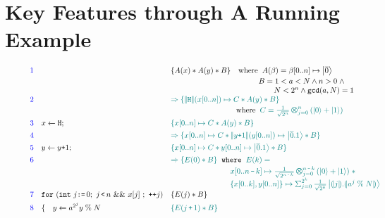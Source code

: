 \section{Key Features through A Running Example}
\label{sec:shors}

\begin{figure}[t]
{\small
\[\hspace*{-1em}
\begin{array}{r l  l}
\textcolor{blue}{1}
&&
\{A(x) * A(y) * B \}
\quad\text{where}\;\;
A(\beta) = \beta[0..n] \mapsto \ket{\overline{0}} 
\\[0.2em]
&&
\qquad\qquad\qquad
\qquad\qquad\quad
\begin{array}{l}
B = 1 < a < N \wedge n > 0 \;\wedge
\\\qquad N < 2^n \wedge \texttt{gcd}(a,N)=1
\end{array}
\\[0.5em]
\textcolor{blue}{2}
&
&
\textcolor{teal}{
\Rightarrow
\{\dabs{\ihadh}(x[0..n]) \mapsto C * A(y) * B \}
}
\\[0.2em]
&&
\qquad\qquad\qquad
\qquad\;\;
\text{where}
\;\;
\textcolor{teal}{
C = \shad{2^n}{n}{}
}
\\[0.5em]
\textcolor{blue}{3}
& \ssassign{x}{}{\ihadh};
&
\textcolor{teal}{
\{x[0..n] \mapsto C * A(y) * B \}
}
\\[0.4em]
\textcolor{blue}{4}
&
&
\textcolor{teal}{
\Rightarrow
\{x[0..n] \mapsto C * \dabs{y\splus 1}(y[0..n]) \mapsto \ket{\overline{0}.1} * B \}
}
\\[0.4em]
\textcolor{blue}{5}
& \ssassign{y}{}{y\splus 1};
&
\textcolor{teal}{
\{x[0..n] \mapsto C * y[0..n] \mapsto \ket{\overline{0}.1} * B \}
}
\\[0.4em]
\textcolor{blue}{6}
& 
&
\textcolor{teal}{
\Rightarrow
\{ E(0) * B \}
}
\;\;
\texttt{where}\;\;
\textcolor{teal}{E(k) =}
\\[0.2em]
&&
\qquad\qquad\quad\;
\qquad
\textcolor{teal}{
\begin{array}{l}
x[0..n\,\sminus\,k] \mapsto \shad{2^{n \,\sminus\,  k}}{n \,\sminus\, k}{}\;*
\\[0.2em]
\{x[0..k],y[0..n]\} \mapsto \sch{2^k}{\frac{1}{\sqrt{2^k}}}{\tos{j}.\tos{a^{j}\;\%\;N}}
\end{array}
}
\\[0.4em]
\textcolor{blue}{7}
&\sqforh{\sint{j}{0}}{j\,\slt\, n}{x[j]}{\dplus{j}}
&
\{E(j) * B \}
\\[0.4em]
\textcolor{blue}{8}
&
\{\quad  \ssassign{y}{}{a^{2^j}y\;\%\; N}
&
\textcolor{teal}{
\{E(j\,\splus\, 1) * B \}
}
\end{array}\]}
\end{figure}
